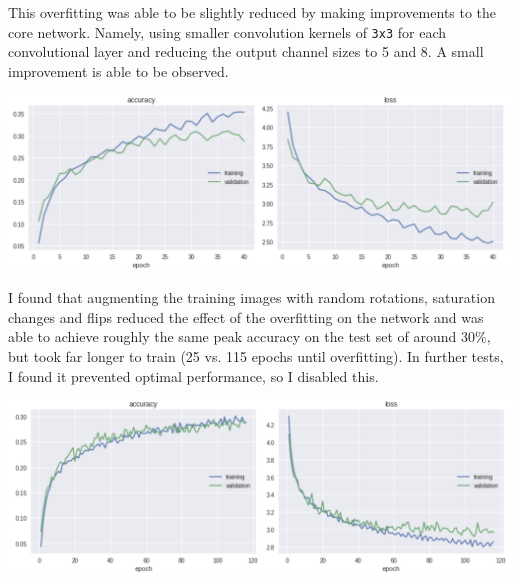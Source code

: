 \documentclass[11pt]{article}
\begin{document}
This overfitting was able to be slightly reduced by making improvements to the core network. Namely, using smaller convolution kernels of \texttt{3x3} for each convolutional layer and reducing the output channel sizes to 5 and 8. A small improvement is able to be observed.

   \begin{center}
        \begin{minipage}{0.75\linewidth}
            \includegraphics[width=\linewidth]{accuracy4}
            \label{fig:first-conv}
        \end{minipage}%
    \end{center}
    
I found that augmenting the training images with random rotations, saturation changes and flips reduced the effect of the overfitting on the network and was able to achieve roughly the same peak accuracy on the test set of around 30\%, but took far longer to train (25 vs. 115 epochs until overfitting). In further tests, I found it prevented optimal performance, so I disabled this.

   \begin{center}
        \begin{minipage}{0.75\linewidth}
            \includegraphics[width=\linewidth]{accuracy5}
            \label{fig:first-conv}
        \end{minipage}%
    \end{center}
    
\end{document}

